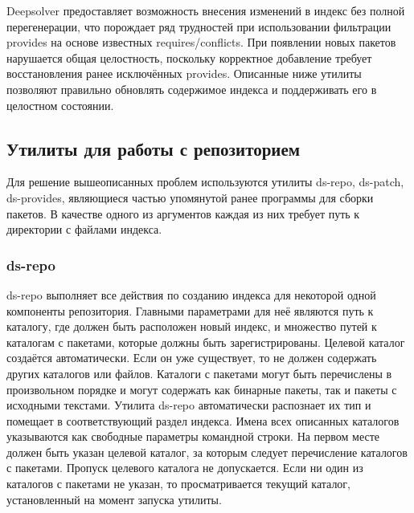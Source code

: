 Deepsolver предоставляет возможность внесения изменений в индекс без
полной перегенерации, что порождает ряд трудностей при использовании
фильтрации provides на основе известных requires/conflicts. При появлении
новых пакетов нарушается общая целостность, поскольку корректное добавление
требует восстановления ранее исключённых provides. Описанные ниже
утилиты позволяют правильно обновлять содержимое индекса и поддерживать
его в целостном состоянии.

\subsection{Утилиты для работы с репозиторием}
Для решение вышеописанных проблем используются утилиты ds-repo, ds-patch,
ds-provides, являющиеся частью упомянутой ранее программы для сборки пакетов.
В качестве одного из аргументов каждая из них требует путь к директории с файлами индекса.

\subsubsection{ds-repo}
 ds-repo выполняет все действия по созданию индекса для некоторой
одной компоненты репозитория. Главными параметрами для неё являются
путь к каталогу, где должен быть расположен новый индекс, и множество
путей к каталогам с пакетами, которые должны быть зарегистрированы. 
Целевой каталог создаётся автоматически. Если он уже существует, то не 
должен содержать других каталогов или файлов. Каталоги с пакетами могут
быть перечислены в произвольном порядке и могут содержать как бинарные
пакеты, так и пакеты с исходными текстами. Утилита ds-repo автоматически
распознает их тип и помещает в соответствующий раздел индекса. Имена
всех описанных каталогов указываются как свободные параметры командной
строки. На первом месте должен быть указан целевой каталог, за которым
следует перечисление каталогов с пакетами. Пропуск целевого каталога
не допускается. Если ни один из каталогов с пакетами не указан, то 
просматривается текущий каталог, установленный на момент запуска утилиты.

